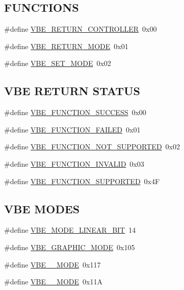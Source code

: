 \subsection*{F\+U\+N\+C\+T\+I\+O\+NS}
\begin{DoxyCompactItemize}
\item 
\#define \hyperlink{group__vbe_ga7850c02defc99773b2704700c6cab3fd}{V\+B\+E\+\_\+\+R\+E\+T\+U\+R\+N\+\_\+\+C\+O\+N\+T\+R\+O\+L\+L\+ER}~0x00
\item 
\#define \hyperlink{group__vbe_gab9d80b9e6d7846ea3fa090c817771866}{V\+B\+E\+\_\+\+R\+E\+T\+U\+R\+N\+\_\+\+M\+O\+DE}~0x01
\item 
\#define \hyperlink{group__vbe_ga02477c4996ff058aee590b54f2146eb5}{V\+B\+E\+\_\+\+S\+E\+T\+\_\+\+M\+O\+DE}~0x02
\end{DoxyCompactItemize}
\subsection*{V\+BE R\+E\+T\+U\+RN S\+T\+A\+T\+US}
\begin{DoxyCompactItemize}
\item 
\#define \hyperlink{group__vbe_gaf48e8544d690af8d91d99653bad50a28}{V\+B\+E\+\_\+\+F\+U\+N\+C\+T\+I\+O\+N\+\_\+\+S\+U\+C\+C\+E\+SS}~0x00
\item 
\#define \hyperlink{group__vbe_ga0a4df98507b443e279641268d5583a3e}{V\+B\+E\+\_\+\+F\+U\+N\+C\+T\+I\+O\+N\+\_\+\+F\+A\+I\+L\+ED}~0x01
\item 
\#define \hyperlink{group__vbe_ga265850c04b2ec9164871c40cb8aa3b4f}{V\+B\+E\+\_\+\+F\+U\+N\+C\+T\+I\+O\+N\+\_\+\+N\+O\+T\+\_\+\+S\+U\+P\+P\+O\+R\+T\+ED}~0x02
\item 
\#define \hyperlink{group__vbe_ga48de88d26f563ed30a13e8158b90a54f}{V\+B\+E\+\_\+\+F\+U\+N\+C\+T\+I\+O\+N\+\_\+\+I\+N\+V\+A\+L\+ID}~0x03
\item 
\#define \hyperlink{group__vbe_ga4aba3d39cac7f9bc65f8b97a8daa88c6}{V\+B\+E\+\_\+\+F\+U\+N\+C\+T\+I\+O\+N\+\_\+\+S\+U\+P\+P\+O\+R\+T\+ED}~0x4F
\end{DoxyCompactItemize}
\subsection*{V\+BE M\+O\+D\+ES}
\begin{DoxyCompactItemize}
\item 
\#define \hyperlink{group__vbe_ga6d93a7fdde65a4c44c41cd0fae46a471}{V\+B\+E\+\_\+\+M\+O\+D\+E\+\_\+\+L\+I\+N\+E\+A\+R\+\_\+\+B\+IT}~14
\item 
\#define \hyperlink{group__vbe_gaa0cd0b74a86aa2dc9eb78017743d6f1a}{V\+B\+E\+\_\+\+G\+R\+A\+P\+H\+I\+C\+\_\+\+M\+O\+DE}~0x105
\item 
\#define \hyperlink{group__vbe_gac01942dc601c03d128c481824b1ae1d3}{V\+B\+E\+\_\+\_\+\+M\+O\+DE}~0x117
\item 
\#define \hyperlink{group__vbe_gaf744f251b7e7d0acd6224997e46def7b}{V\+B\+E\+\_\+\_\+\+M\+O\+DE}~0x11A
\end{DoxyCompactItemize}



